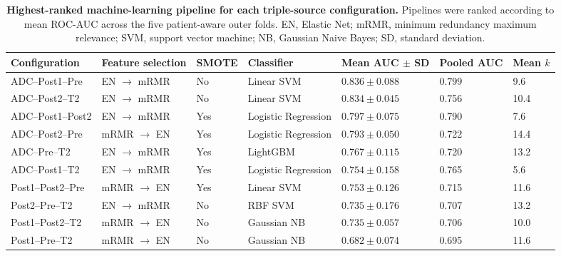 \documentclass[12pt,twocolumn]{article}
\begin{document}
\begin{table}[htbp]
\centering
\caption{\textbf{Highest-ranked machine-learning pipeline for each
triple-source configuration.}
Pipelines were ranked according to mean ROC-AUC across the five
patient-aware outer folds. EN, Elastic Net; mRMR, minimum redundancy
maximum relevance; SVM, support vector machine; NB, Gaussian Naive
Bayes; SD, standard deviation.}
\label{tab:triple_source_results}
\scriptsize
\begin{tabularx}{\textwidth}{
    p{2.5cm}
    p{2.6cm}
    p{1.1cm}
    p{2.3cm}
    p{2.4cm}
    p{1.8cm}
    X
}
\toprule
\textbf{Configuration} &
\textbf{Feature selection} &
\textbf{SMOTE} &
\textbf{Classifier} &
\textbf{Mean AUC \(\pm\) SD} &
\textbf{Pooled AUC} &
\textbf{Mean \(k\)} \\
\midrule

ADC--Post1--Pre &
EN \(\rightarrow\) mRMR &
No &
Linear SVM &
\(\mathbf{0.836 \pm 0.088}\) &
\(\mathbf{0.799}\) &
9.6 \\

ADC--Post2--T2 &
EN \(\rightarrow\) mRMR &
No &
Linear SVM &
\(0.834 \pm 0.045\) &
0.756 &
10.4 \\

ADC--Post1--Post2 &
EN \(\rightarrow\) mRMR &
Yes &
Logistic Regression &
\(0.797 \pm 0.075\) &
0.790 &
7.6 \\

ADC--Post2--Pre &
mRMR \(\rightarrow\) EN &
Yes &
Logistic Regression &
\(0.793 \pm 0.050\) &
0.722 &
14.4 \\

ADC--Pre--T2 &
EN \(\rightarrow\) mRMR &
Yes &
LightGBM &
\(0.767 \pm 0.115\) &
0.720 &
13.2 \\

ADC--Post1--T2 &
EN \(\rightarrow\) mRMR &
Yes &
Logistic Regression &
\(0.754 \pm 0.158\) &
0.765 &
5.6 \\

Post1--Post2--Pre &
mRMR \(\rightarrow\) EN &
Yes &
Linear SVM &
\(0.753 \pm 0.126\) &
0.715 &
11.6 \\

Post2--Pre--T2 &
EN \(\rightarrow\) mRMR &
No &
RBF SVM &
\(0.735 \pm 0.176\) &
0.707 &
13.2 \\

Post1--Post2--T2 &
mRMR \(\rightarrow\) EN &
No &
Gaussian NB &
\(0.735 \pm 0.057\) &
0.706 &
10.0 \\

Post1--Pre--T2 &
mRMR \(\rightarrow\) EN &
No &
Gaussian NB &
\(0.682 \pm 0.074\) &
0.695 &
11.6 \\

\bottomrule
\end{tabularx}
\end{table}
\end{document}
